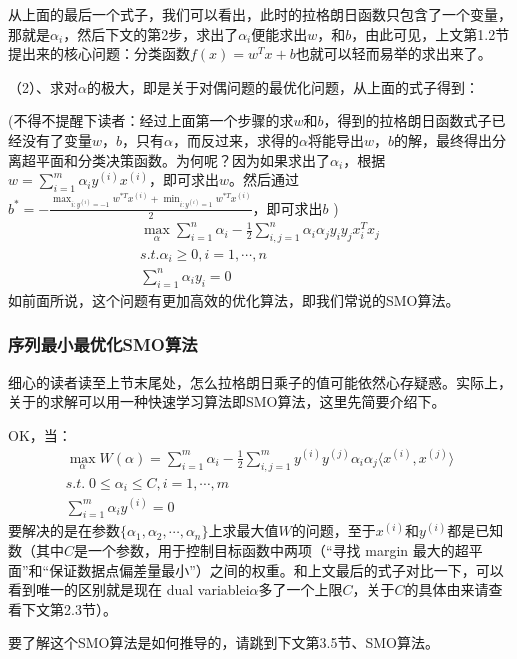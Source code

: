 \documentclass[a4paper,12pt]{article}
\begin{document}
  从上面的最后一个式子，我们可以看出，此时的拉格朗日函数只包含了一个变量，那就是$\alpha_i$，然后下文的第2步，求出了$\alpha_i$便能求出$w$，和$b$，由此可见，上文第1.2节提出来的核心问题：分类函数$f(x)=w^Tx+b$也就可以轻而易举的求出来了。

（2）、求对$\alpha$的极大，即是关于对偶问题的最优化问题，从上面的式子得到：

(不得不提醒下读者：经过上面第一个步骤的求$w$和$b$，得到的拉格朗日函数式子已经没有了变量$w$，$b$，只有$\alpha$，而反过来，求得的$\alpha$将能导出$w$，$b$的解，最终得出分离超平面和分类决策函数。为何呢？因为如果求出了$\alpha_i$，根据$w=\sum_{i=1}^m\alpha_iy^{(i)}x^{(i)}$，即可求出$w$。然后通过
$b^*=-\frac{\max_{i:y^{(i)}=-1}w^{*T}x^{(i)}+\min_{i:y^{(i)}=1}w^{*T}x^{(i)}}{2}$，即可求出$b$ )
\begin{equation}
  \begin{split}
    \max_\alpha\sum_{i=1}^n\alpha_i-\frac{1}{2}\sum_{i,j=1}^n\alpha_i\alpha_jy_iy_jx_i^Tx_j\\
    s.t.\alpha_i\geq0,i=1,\cdots,n\\
   \sum_{i=1}^n\alpha_iy_i=0
  \end{split}
\end{equation}
如前面所说，这个问题有更加高效的优化算法，即我们常说的SMO算法。
\subsubsection{序列最小最优化SMO算法}
细心的读者读至上节末尾处，怎么拉格朗日乘子的值可能依然心存疑惑。实际上，关于的求解可以用一种快速学习算法即SMO算法，这里先简要介绍下。

OK，当：
\begin{equation}
  \begin{split}
    \max_\alpha W(\alpha)=\sum_{i=1}^m\alpha_i-\frac{1}{2}\sum_{i,j=1}^my^{(i)}y^{(j)}\alpha_i\alpha_j\langle x^{(i)},x^{(j)}\rangle\\
    s.t.\; 0\leq\alpha_i\leq C,i=1,\cdots,m\\
    \sum_{i=1}^m\alpha_iy^{(i)}=0
  \end{split}
\end{equation}
要解决的是在参数$\{\alpha_1,\alpha_2,\cdots,\alpha_n\}$上求最大值$W$的问题，至于$x^{(i)}$和$y^{(i)}$都是已知数（其中$C$是一个参数，用于控制目标函数中两项（“寻找 margin 最大的超平面”和“保证数据点偏差量最小”）之间的权重。和上文最后的式子对比一下，可以看到唯一的区别就是现在 dual variablei$\alpha$多了一个上限$C$，关于$C$的具体由来请查看下文第2.3节）。

要了解这个SMO算法是如何推导的，请跳到下文第3.5节、SMO算法。
\end{document}

